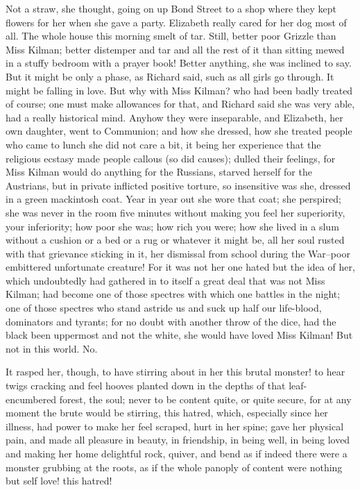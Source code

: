 \documentclass[lang=cn,10pt]{elegantbook}
\begin{document}
Not a straw, she thought, going on up Bond Street to a shop where
they kept flowers for her when she gave a party.  Elizabeth really
cared for her dog most of all.  The whole house this morning smelt
of tar.  Still, better poor Grizzle than Miss Kilman; better
distemper and tar and all the rest of it than sitting mewed in a
stuffy bedroom with a prayer book!  Better anything, she was
inclined to say.  But it might be only a phase, as Richard said,
such as all girls go through.  It might be falling in love.  But
why with Miss Kilman? who had been badly treated of course; one
must make allowances for that, and Richard said she was very able,
had a really historical mind.  Anyhow they were inseparable, and
Elizabeth, her own daughter, went to Communion; and how she
dressed, how she treated people who came to lunch she did not care
a bit, it being her experience that the religious ecstasy made
people callous (so did causes); dulled their feelings, for Miss
Kilman would do anything for the Russians, starved herself for the
Austrians, but in private inflicted positive torture, so
insensitive was she, dressed in a green mackintosh coat.  Year in
year out she wore that coat; she perspired; she was never in the
room five minutes without making you feel her superiority, your
inferiority; how poor she was; how rich you were; how she lived in
a slum without a cushion or a bed or a rug or whatever it might be,
all her soul rusted with that grievance sticking in it, her
dismissal from school during the War--poor embittered unfortunate
creature!  For it was not her one hated but the idea of her, which
undoubtedly had gathered in to itself a great deal that was not
Miss Kilman; had become one of those spectres with which one
battles in the night; one of those spectres who stand astride us
and suck up half our life-blood, dominators and tyrants; for no
doubt with another throw of the dice, had the black been uppermost
and not the white, she would have loved Miss Kilman!  But not in
this world.  No.

It rasped her, though, to have stirring about in her this brutal
monster! to hear twigs cracking and feel hooves planted down in the
depths of that leaf-encumbered forest, the soul; never to be
content quite, or quite secure, for at any moment the brute would
be stirring, this hatred, which, especially since her illness, had
power to make her feel scraped, hurt in her spine; gave her
physical pain, and made all pleasure in beauty, in friendship, in
being well, in being loved and making her home delightful rock,
quiver, and bend as if indeed there were a monster grubbing at the
roots, as if the whole panoply of content were nothing but self
love! this hatred!
\end{document}
